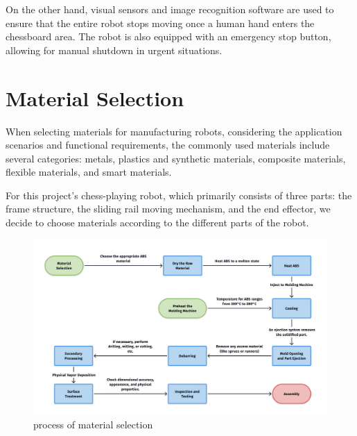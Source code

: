 \documentclass[10pt, a4paper, twocolumn]{article}
\begin{document}
On the other hand, visual sensors and image recognition software are used to ensure that the entire robot stops moving once a human hand enters the chessboard area. The robot is also equipped with an emergency stop button, allowing for manual shutdown in urgent situations.

\section{Material Selection}
When selecting materials for manufacturing robots, considering the application scenarios and functional requirements, the commonly used materials include several categories: metals, plastics and synthetic materials, composite materials, flexible materials, and smart materials.

For this project's chess-playing robot, which primarily consists of three parts: the frame structure, the sliding rail moving mechanism, and the end effector, we decide to choose materials according to the different parts of the robot.

\begin{figure}
    \centering
    \includegraphics[width=\linewidth]{material selection.jpg}
    \caption{process of material selection}
    \label{fig:process of material selection}
\end{figure}
\end{document}
